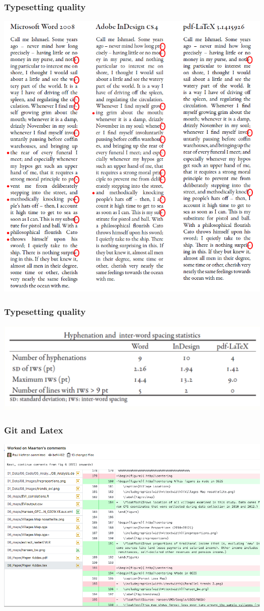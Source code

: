 \documentclass{beamer}
\begin{document}
\begin{frame}[t]\frametitle{Typesetting quality}
	\centering\includegraphics[width=\textwidth]{typesetting_examples.png}
\end{frame}

\begin{frame}[t]\frametitle{Typesetting quality}
	\centering\includegraphics[width=\textwidth]{tex_versus_stats.png}
\end{frame}


\begin{frame}[t]\frametitle{Git and Latex}
	\centering\includegraphics[width=\textwidth]{git_latex_example.png}
\end{frame}
\end{document}
